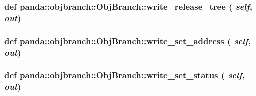 \label{classpanda_1_1objbranch_1_1ObjBranch_aa7d9351e87ed432337bb2fbd807dc857}
\hypertarget{classpanda_1_1objbranch_1_1ObjBranch_a0549e3b6bc15d28913cebac1deebbe47}{
\subsubsection[{write\_\-release\_\-tree}]{\setlength{\rightskip}{0pt plus 5cm}def panda::objbranch::ObjBranch::write\_\-release\_\-tree ( {\em self}, \/   {\em out})}}
\label{classpanda_1_1objbranch_1_1ObjBranch_a0549e3b6bc15d28913cebac1deebbe47}
\hypertarget{classpanda_1_1objbranch_1_1ObjBranch_a79954c7cd8a0afb7cc3b24c493487956}{
\subsubsection[{write\_\-set\_\-address}]{\setlength{\rightskip}{0pt plus 5cm}def panda::objbranch::ObjBranch::write\_\-set\_\-address ( {\em self}, \/   {\em out})}}
\label{classpanda_1_1objbranch_1_1ObjBranch_a79954c7cd8a0afb7cc3b24c493487956}
\hypertarget{classpanda_1_1objbranch_1_1ObjBranch_af6f04622759dddc4e24eb980f0140b29}{
\subsubsection[{write\_\-set\_\-status}]{\setlength{\rightskip}{0pt plus 5cm}def panda::objbranch::ObjBranch::write\_\-set\_\-status ( {\em self}, \/   {\em out})}}
\label{classpanda_1_1objbranch_1_1ObjBranch_af6f04622759dddc4e24eb980f0140b29}


